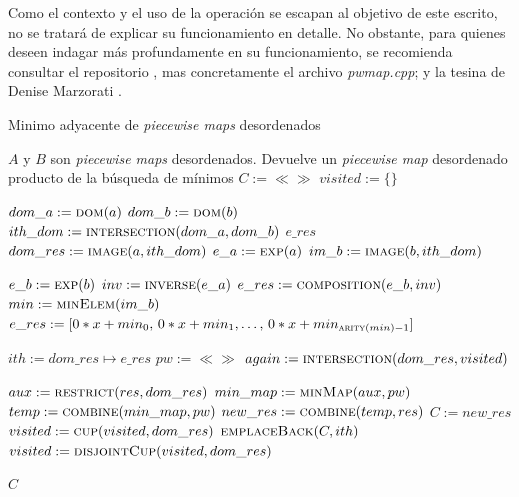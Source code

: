 Como el contexto y el uso de la operación se escapan al objetivo de este escrito, no se tratará de explicar su funcionamiento en detalle. No obstante, para quienes deseen indagar más profundamente en su funcionamiento, se recomienda consultar el repositorio \cite{sbg}, mas concretamente el archivo \textit{pwmap.cpp}; y la tesina de Denise Marzorati \cite{sbg}. 

\begin{algorithm}
\caption{Minimo adyacente de \textit{piecewise maps} desordenados}
\label{alg:minAdjMapUnordPWMap}
\begin{algorithmic}[1]
\Require $A$ y $B$ son \textit{piecewise maps} desordenados.
\Ensure Devuelve un \textit{piecewise map} desordenado producto de la búsqueda de mínimos
  \State $C := \ll\gg$ 
  \State $visited := \{\}$

      \State $dom\_a := \Call{dom}{a}$
      \State $dom\_b := \Call{dom}{b}$
      \State $ith\_dom := \Call{intersection}{dom\_a, dom\_b}$
        \State $e\_res$ 
        \State $dom\_res := \Call{image}{a, ith\_dom}$  
        \State $e\_a := \Call{exp}{a}$
        \State $im\_b := \Call{image}{b, ith\_dom}$

          \State $e\_b := \Call{exp}{b}$
          \State $inv := \Call{inverse}{e\_a}$
          \State $e\_res := \Call{composition}{e\_b, inv}$
        \Else
          \State $min := \Call{minElem}{im\_b}$
          \State $e\_res := [0*x + min_0,\, 0*x + min_1,\dots, \,0*x + min_{\Call{arity}{min}-1}]$
        \EndIf

          \State $ith := dom\_res \mapsto e\_res$
          \State $pw := \ll\gg$
          \State $again := \Call{intersection}{dom\_res, visited}$

            \State $aux := \Call{restrict}{res,dom\_res}$
            \State $min\_map := \Call{minMap}{aux, pw}$
            \State $temp := \Call{combine}{min\_map, pw}$
            \State $new\_res := \Call{combine}{temp, res}$
            \State $C := new\_res$
            \State $visited := \Call{cup}{visited, dom\_res}$
          \Else
            \State $\Call{emplaceBack}{C, ith}$
            \State $visited := \Call{disjointCup}{visited, dom\_res}$
          \EndIf
        \EndIf
      \EndIf
    \EndFor
  \EndFor

  \State \Return $C$
\EndFunction
\end{algorithmic}
\end{algorithm}


